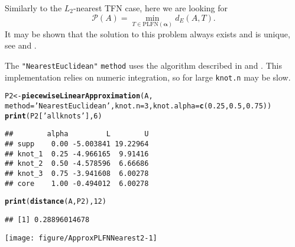 \documentclass[11pt]{article}\usepackage[]{graphicx}\usepackage[]{color}
\makeatletter
\newcommand{\hlnum}[1]{\textcolor[rgb]{0.686,0.059,0.569}{#1}}%
\newcommand{\hlstr}[1]{\textcolor[rgb]{0.192,0.494,0.8}{#1}}%
\newcommand{\hlstd}[1]{\textcolor[rgb]{0.345,0.345,0.345}{#1}}%
\newcommand{\hlkwb}[1]{\textcolor[rgb]{0.69,0.353,0.396}{#1}}%
\newcommand{\hlkwc}[1]{\textcolor[rgb]{0.333,0.667,0.333}{#1}}%
\newcommand{\hlkwd}[1]{\textcolor[rgb]{0.737,0.353,0.396}{\textbf{#1}}}%
\newenvironment{kframe}{%
 \def\at@end@of@kframe{}%
 \ifinner\ifhmode%
  \def\at@end@of@kframe{\end{minipage}}%
  \begin{minipage}{\columnwidth}%
 \fi\fi%
 \def\FrameCommand##1{\hskip\@totalleftmargin \hskip-\fboxsep
 \colorbox{shadecolor}{##1}\hskip-\fboxsep
     \hskip-\linewidth \hskip-\@totalleftmargin \hskip\columnwidth}%
 \MakeFramed {\advance\hsize-\width
   \@totalleftmargin\z@ \linewidth\hsize
   \@setminipage}}%
 {\par\unskip\endMakeFramed%
 \at@end@of@kframe}
\newenvironment{knitrout}{}{} %
\newcommand{\argument}[1]{\texttt{\hlkwc{#1}}}
\newcommand{\str}[1]{\texttt{\hlstr{#1}}}
\makeatother
\begin{document}
Similarly to the $L_2$-nearest TFN case, here we are looking for
\[
\mathcal{P}(A)=\min\limits_{T\in \mathrm{PLFN}(\boldsymbol\alpha)}d_E(A,T).
\]
It may be shown that the solution to this problem
always exists and is unique, see \cite{CoroianuETAL2013:piecewise1}
and \cite{CoroianuETALXXXX:piecewise2}.

The \str{"{}NearestEuclidean"{}} \argument{method}
uses the algorithm described in \cite{CoroianuETAL2013:piecewise1}
and \cite{CoroianuETALXXXX:piecewise2}.
This implementation relies on numeric integration, so for large \argument{knot.n}
may be slow.

\begin{knitrout}\small
{}\color{fgcolor}\begin{kframe}
\begin{alltt}
\hlstd{P2} \hlkwb{<-} \hlkwd{piecewiseLinearApproximation}\hlstd{(A,}
   \hlkwc{method}\hlstd{=}\hlstr{'NearestEuclidean'}\hlstd{,} \hlkwc{knot.n}\hlstd{=}\hlnum{3}\hlstd{,} \hlkwc{knot.alpha}\hlstd{=}\hlkwd{c}\hlstd{(}\hlnum{0.25}\hlstd{,}\hlnum{0.5}\hlstd{,}\hlnum{0.75}\hlstd{))}
\hlkwd{print}\hlstd{(P2[}\hlstr{'allknots'}\hlstd{],} \hlnum{6}\hlstd{)}
\end{alltt}
\begin{verbatim}
##        alpha         L        U
## supp    0.00 -5.003841 19.22964
## knot_1  0.25 -4.966165  9.91416
## knot_2  0.50 -4.578596  6.66686
## knot_3  0.75 -3.941608  6.00278
## core    1.00 -0.494012  6.00278
\end{verbatim}
\begin{alltt}
\hlkwd{print}\hlstd{(}\hlkwd{distance}\hlstd{(A, P2),} \hlnum{12}\hlstd{)}
\end{alltt}
\begin{verbatim}
## [1] 0.28896014678
\end{verbatim}
\end{kframe}
\end{knitrout}

\begin{center}
\begin{knitrout}\small
{}\color{fgcolor}

{\centering \texttt{[image: figure/ApproxPLFNNearest2-1]} 

}



\end{knitrout}
\end{center}
\end{document}
